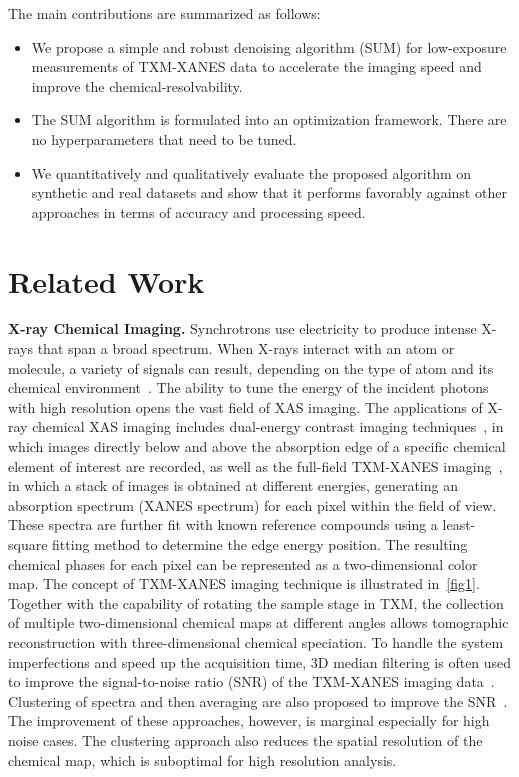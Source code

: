 \documentclass[10pt,twocolumn,letterpaper]{article}
\begin{document}
The main contributions are summarized as follows:

\begin{samepage}
\begin{itemize}
    \item We propose a simple and robust denoising algorithm (SUM) for low-exposure measurements of TXM-XANES data to accelerate the imaging speed and improve the chemical-resolvability.
    \item The SUM algorithm is formulated into an optimization framework. There are no hyperparameters that need to be tuned.
    \item We quantitatively and qualitatively evaluate the proposed algorithm on synthetic and real datasets and show that it performs favorably against other approaches in terms of accuracy and processing speed.
\end{itemize}
  \end{samepage}


\section{Related Work}
\textbf{X-ray Chemical Imaging.} Synchrotrons use electricity to produce intense X-rays that span a broad spectrum. When X-rays interact with an atom or molecule, a variety of signals can result, depending on the type of atom and its chemical environment~\cite{national2006visualizing}. The ability to tune the energy of the incident photons with high resolution opens the vast field of XAS imaging. The applications of X-ray chemical XAS imaging includes dual-energy contrast imaging techniques~\cite{grew2010nondestructive}, in which images directly below and above the absorption edge of a specific chemical element of interest are recorded, as well as the full-field TXM-XANES imaging~\cite{meirer2011three,wang2014operando}, in which a stack of images is obtained at different energies, generating an absorption spectrum (XANES spectrum) for each pixel within the field of view. These spectra are further fit with known reference compounds using a least-square fitting method to determine the edge energy position. The resulting chemical phases for each pixel can be represented as a two-dimensional color map. The concept of TXM-XANES imaging technique is illustrated in~\cref{fig1}. Together with the capability of rotating the sample stage in TXM, the collection of multiple two-dimensional chemical maps at different angles allows tomographic reconstruction with three-dimensional chemical speciation. To handle the system imperfections and speed up the acquisition time, 3D median filtering is often used to improve the signal-to-noise ratio (SNR) of the TXM-XANES imaging data~\cite{meirer2011three,liu2012txm}. Clustering of spectra and then averaging are also proposed to improve the SNR~\cite{qian2021understanding}. The improvement of these approaches, however, is marginal especially for high noise cases. The clustering approach also reduces the spatial resolution of the chemical map, which is suboptimal for high resolution analysis. 
\end{document}
